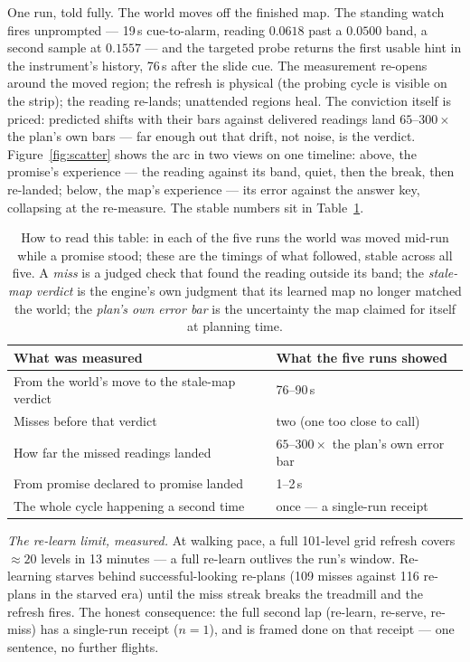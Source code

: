 \documentclass[11pt,a4paper]{article}
\begin{document}
One run, told fully. The world moves off the finished map. The
standing watch fires unprompted --- 19\,s cue-to-alarm, reading
$0.0618$ past a $0.0500$ band, a second sample at $0.1557$ --- and
the targeted probe returns the first usable hint in the instrument's
history, 76\,s after the slide cue. The measurement re-opens around
the moved region; the refresh is physical (the probing cycle is
visible on the strip); the reading re-lands; unattended regions
heal. The conviction itself is priced: predicted shifts with their
bars against delivered readings land $65$--$300\times$ the plan's
own bars --- far enough out that drift, not noise, is the verdict.
Figure~\ref{fig:scatter} shows the arc in two views on one
timeline: above, the promise's experience --- the reading against
its band, quiet, then the break, then re-landed; below, the map's
experience --- its error against the answer key, collapsing at the
re-measure. The stable numbers sit in Table~\ref{tab:d1}.

\begin{table}[!ht]
\centering
\small
\begin{tabular}{@{}ll@{}}
\toprule
\textbf{What was measured} & \textbf{What the five runs showed} \\
\midrule
From the world's move to the stale-map verdict & 76--90\,s \\
Misses before that verdict & two (one too close to call) \\
How far the missed readings landed & $65$--$300\times$ the plan's
own error bar \\
From promise declared to promise landed & 1--2\,s \\
The whole cycle happening a second time & once --- a single-run
receipt \\
\bottomrule
\end{tabular}
\caption{How to read this table: in each of the five runs the world
was moved mid-run while a promise stood; these are the timings of
what followed, stable across all five. A \emph{miss} is a judged
check that found the reading outside its band; the
\emph{stale-map verdict} is the engine's own judgment that its
learned map no longer matched the world; the \emph{plan's own
error bar} is the uncertainty the map claimed for itself at
planning time.}
\label{tab:d1}
\end{table}

\emph{The re-learn limit, measured.} At walking pace, a full
101-level grid refresh covers ${\approx}20$ levels in 13 minutes ---
a full re-learn outlives the run's window. Re-learning starves
behind successful-looking re-plans (109 misses against 116 re-plans
in the starved era) until the miss streak breaks the treadmill and
the refresh fires. The honest consequence: the full second lap
(re-learn, re-serve, re-miss) has a single-run receipt ($n{=}1$),
and is framed done on that receipt --- one sentence, no further
flights.
\end{document}
